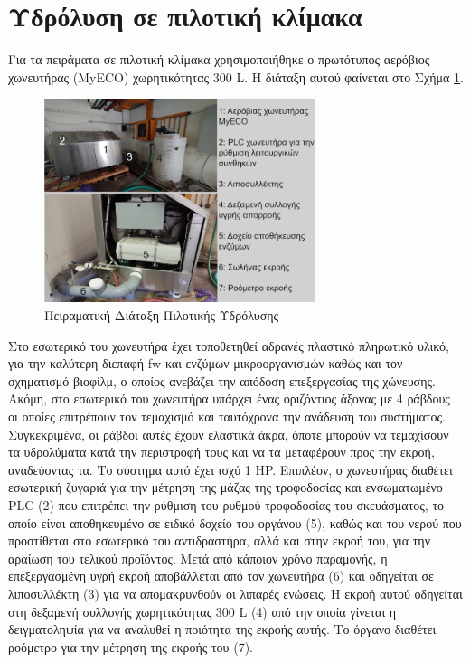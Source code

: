 \documentclass[11pt]{report}
\begin{document}
\section{Υδρόλυση σε πιλοτική κλίμακα}
\label{sec:org9d0835d}
\label{sec:pilot-exp}

Για τα πειράματα σε πιλοτική κλίμακα χρησιμοποιήθηκε ο πρωτότυπος αερόβιος χωνευτήρας (MyECO) χωρητικότητας 300 L. Η διάταξη αυτού φαίνεται στο Σχήμα \ref{fig:orga7b1593}.

\begin{figure}[htbp]
\centering
\includegraphics[width=300px]{./pilot_hydrolysis_captioned.png}
\caption{\label{fig:orga7b1593}Πειραματική Διάταξη Πιλοτικής Υδρόλυσης}
\end{figure}

Στο εσωτερικό του χωνευτήρα έχει τοποθετηθεί αδρανές πλαστικό πληρωτικό υλικό, για την καλύτερη διεπαφή \acrshort{fw} και ενζύμων-μικροοργανισμών καθώς και τον σχηματισμό βιοφίλμ, ο οποίος ανεβάζει την απόδοση επεξεργασίας της χώνευσης. Ακόμη, στο εσωτερικό του χωνευτήρα υπάρχει ένας οριζόντιος άξονας με 4 ράβδους οι οποίες επιτρέπουν τον τεμαχισμό και ταυτόχρονα την ανάδευση του συστήματος. Συγκεκριμένα, οι ράβδοι αυτές έχουν ελαστικά άκρα, όποτε μπορούν να τεμαχίσουν τα υδρολύματα κατά την περιστροφή τους και να τα μεταφέρουν προς την εκροή, αναδεύοντας τα. Το σύστημα αυτό έχει ισχύ 1 HP. Επιπλέον, ο χωνευτήρας διαθέτει εσωτερική ζυγαριά για την μέτρηση της μάζας της τροφοδοσίας και ενσωματωμένο PLC (2) που επιτρέπει την ρύθμιση του ρυθμού τροφοδοσίας του σκευάσματος, το οποίο είναι αποθηκευμένο σε ειδικό δοχείο του οργάνου (5), καθώς και του νερού που προστίθεται στο εσωτερικό του αντιδραστήρα, αλλά και στην εκροή του, για την αραίωση του τελικού προϊόντος. Μετά από κάποιον χρόνο παραμονής, η επεξεργασμένη υγρή εκροή αποβάλλεται από τον χωνευτήρα (6) και οδηγείται σε λιποσυλλέκτη (3) για να απομακρυνθούν οι λιπαρές ενώσεις. Η εκροή αυτού οδηγείται στη δεξαμενή συλλογής χωρητικότητας 300 L (4) από την οποία γίνεται η δειγματοληψία για να αναλυθεί η ποιότητα της εκροής αυτής. Το όργανο διαθέτει ροόμετρο για την μέτρηση της εκροής του (7).
\end{document}
